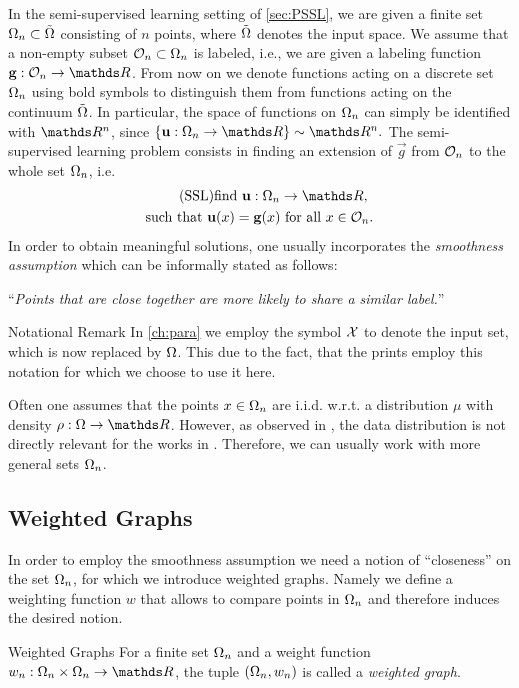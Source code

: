 In the semi-supervised learning setting of \cref{sec:PSSL}, we are given a finite set $\Omega_n\subset \tilde{\Omega}$ consisting of $n$ points, where $\tilde{\Omega}$ 
denotes the input space. We assume that a non-empty subset $\mathcal{O}_n \subset \Omega_n$ is labeled, i.e., we are given a labeling function
$\vec g:\conset_n\to\R$. From now on we denote functions acting on a discrete set $\Omega_n$ using bold symbols to distinguish them from functions acting on the continuum $\tilde{\Omega}$. In particular, the space of functions on $\Omega_n$ can simply be identified with $\R^n$, since $\{\vec u:\domain_n\to\R\} \sim \R^n.$
%
\noindent%
The semi-supervised learning problem consists in finding an extension of $\vec g$ from $\mathcal{O}_n$ to the whole set $\Omega_n$, i.e.
%
\begin{gather}\label{eq:SSL}
\begin{gathered}\tag{SSL}
\text{find } \vec u:\domain_n\to\R,\\
\text{such that } \vec u(x) = \vec g(x) \text{ for all } x\in\conset_n.
\end{gathered}
\end{gather}
%
%
%
%
In order to obtain meaningful solutions, one usually incorporates the \emph{smoothness assumption} \cite{subramanya2014graph} which can be informally stated as follows:
%
\begin{center}
\enquote{\textit{Points that are close together are more likely to share a similar label.}}
\end{center}
%
%

\begin{remark}{Notational Remark}{}
In \cref{ch:para} we employ the symbol $\mathcal{X}$ to denote the input set, which is now replaced by $\Omega$. This due to the fact, that the prints \cite{bungert2021uniform, bungert2022ratio, roith2022continuum} employ this notation for which we choose to use it here.
\end{remark}
%
%
Often one assumes that the points $x\in\Omega_n$ are i.i.d. w.r.t. a distribution $\mu$ with density $\rho:\domain\to\R$. However, as observed in \cite{roith2022msc}, the data distribution is not directly relevant for the works in \cite{roith2022continuum, bungert2021uniform}. Therefore, we can usually work with more general sets $\Omega_n$.
%
%
\subsection{Weighted Graphs}
In order to employ the smoothness assumption we need a notion of \enquote{closeness} on the set $\Omega_n$, for which we introduce weighted graphs. Namely we define a weighting function $w$ that allows to compare points in $\Omega_n$ and therefore induces the desired notion. 
%
\begin{definition}{Weighted Graphs}{}
For a finite set $\Omega_n$ and a weight function $w_n:\domain_n\times \domain_n\to\R$, the tuple $(\Omega_n,w_n)$ is called a \emph{weighted graph}.
\end{definition}
%
%
